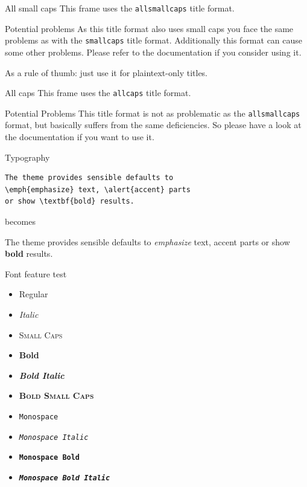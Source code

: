 \documentclass[10pt,spanish,xcolor={svgnames}]{beamer}
\begin{document}
{
\begin{frame}{All small caps}
This frame uses the \texttt{allsmallcaps} title format.

\begin{alertblock}{Potential problems}
As this title format also uses small caps you face the same problems as with the \texttt{smallcaps} title format. Additionally this format can cause some other problems. Please refer to the documentation if you consider using it.

As a rule of thumb: just use it for plaintext-only titles.
\end{alertblock}
\end{frame}
}

{
\begin{frame}{All caps}
This frame uses the \texttt{allcaps} title format.

\begin{alertblock}{Potential Problems}
This title format is not as problematic as the \texttt{allsmallcaps} format, but basically suffers from the same deficiencies. So please have a look at the documentation if you want to use it.
\end{alertblock}
\end{frame}
}


\begin{frame}[fragile]{Typography}
\begin{verbatim}The theme provides sensible defaults to
\emph{emphasize} text, \alert{accent} parts
or show \textbf{bold} results.\end{verbatim}

\begin{center}becomes\end{center}

The theme provides sensible defaults to \emph{emphasize} text,
\alert{accent} parts or show \textbf{bold} results.
\end{frame}

\begin{frame}{Font feature test}
\begin{itemize}
\item Regular
\item \textit{Italic}
\item \textsc{Small Caps}
\item \textbf{Bold}
\item \textbf{\textit{Bold Italic}}
\item \textbf{\textsc{Bold Small Caps}}
\item \texttt{Monospace}
\item \texttt{\textit{Monospace Italic}}
\item \texttt{\textbf{Monospace Bold}}
\item \texttt{\textbf{\textit{Monospace Bold Italic}}}
\end{itemize}
\end{frame}
\end{document}
